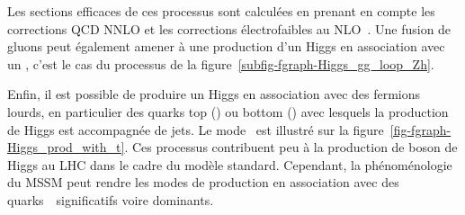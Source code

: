 Les sections efficaces de ces processus sont calculées en prenant en compte les corrections QCD NNLO et les corrections électrofaibles au NLO~\cite{Higgs_xsec_book_4}.
Une fusion de gluons peut également amener à une production d'un Higgs en association avec un \Zboson, c'est le cas du processus de la figure~\ref{subfig-fgraph-Higgs_gg_loop_Zh}.
\par Enfin, il est possible de produire un Higgs en association avec des fermions lourds, en particulier des quarks top (\ttbar\higgs) ou bottom (\quarkb\antiquarkb\higgs) avec lesquels la production de Higgs est accompagnée de jets.
Le mode \ttbar\higgs\ est illustré sur la figure~\ref{fig-fgraph-Higgs_prod_with_t}.
Ces processus contribuent peu à la production de boson de Higgs au LHC dans le cadre du modèle standard.
Cependant, la phénoménologie du MSSM peut rendre les modes de production en association avec des quarks~\quarkb\ significatifs voire dominants.
